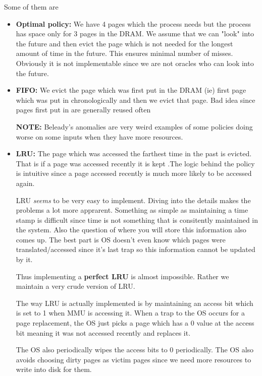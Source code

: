 \documentclass[12pt]{article}
\newcommand{\tbox}[1]{\noindent\fbox{\parbox{\textwidth}{#1}}}
\begin{document}
Some of them are
\begin{itemize}[topsep=0pt]        
    \item \textbf{Optimal policy:} We have 4 pages which the process needs but the process has space only for 3 pages in the DRAM. We assume that we can "look" into the future 
    and then evict the page which is not needed for the longest amount of time in the future. This ensures minimal number of misses. Obviously it is not implementable since we are not oracles
    who can look into the future.
    \item \textbf{FIFO:} We evict the page which was first put in the DRAM (ie) first page which was put in chronologically and then we evict that page. Bad idea since pages first put in are generally reused often
    
    \textbf{NOTE:} Beleady's anomalies are very weird examples of some policies doing worse on some inputs when they have more resources.
    
    \item \textbf{LRU:} The page which was accessed the farthest time in the past is evicted. That is if a page was accessed recently it is kept
    .The logic behind the policy is intuitive since a page accessed recently is much more likely to be accessed again.

    LRU \textit{seems} to be very easy to implement. Diving into the details makes the problems a lot more apprarent. Something as simple as maintaining a time stamp is difficult since 
    time is not something that is consitently maintained in the system. Also the question of where you will store this information also comes up. The best part is OS doesn't even know
    which pages were translated/accessed since it's last trap so this information cannot be updated by it. 

    Thus implementing a \textbf{perfect LRU} is almost impossible. Rather we maintain a very crude version of LRU.

    The way LRU is actually implemented is by maintaining an access bit which is set to 1 when MMU is accessing it. When a trap to the OS
    occurs for a page replacement, the OS just picks a page which has a 0 value at the access bit meaning it was not accessed recently and replaces it.

    The OS also periodically wipes the access bits to 0 periodically. The OS also avoids choosing dirty pages as victim pages since we need more resources to write 
    into disk for them. 
\end{itemize}
\noindent\tbox{
    \begin{center}
    \textbf{\Huge Lecture 18}
    \end{center}
}
\end{document}
